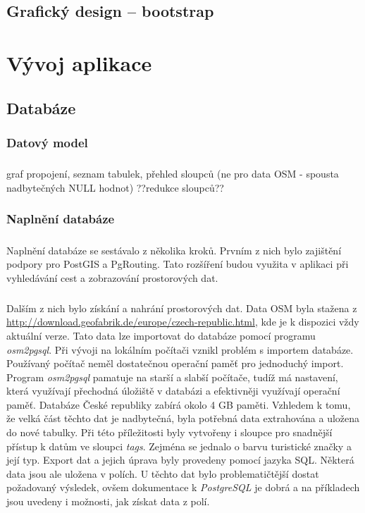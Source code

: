 \documentclass[11pt,a4paper,titlepage,oneside]{book}
\begin{document}
	\section{Grafický design -- bootstrap \cite{bootstrap}}

\chapter{Vývoj aplikace}
		\section{Databáze}
			\subsection{Datový model}
				\paragraph{} graf propojení, seznam tabulek, přehled sloupců (ne pro data OSM - spousta nadbytečných NULL hodnot) ??redukce sloupců??
			\subsection{Naplnění databáze}
				\paragraph{} Naplnění databáze se sestávalo z několika kroků. Prvním z nich bylo zajištění podpory pro PostGIS a PgRouting. Tato rozšíření budou využita v aplikaci při vyhledávání cest a zobrazování prostorových dat.
				\paragraph{}Dalším z nich bylo získání a nahrání prostorových dat. Data OSM byla stažena z  \url{http://download.geofabrik.de/europe/czech-republic.html}, kde je k dispozici vždy aktuální verze. Tato data lze importovat do databáze pomocí programu \textit{osm2pgsql}. Při vývoji na lokálním počítači vznikl problém s importem databáze. Používaný počítač neměl dostatečnou operační paměť pro jednoduchý import. Program \textit{osm2pgsql} pamatuje na starší a slabší počítače, tudíž má nastavení, která využívají přechodná úložiště v databázi a efektivněji využívají operační paměť. Databáze České republiky zabírá okolo 4 GB paměti. Vzhledem k tomu, že velká část těchto dat je nadbytečná, byla potřebná data extrahována a uložena do nové tabulky. Při této příležitosti byly vytvořeny i sloupce pro snadnější přístup k datům ve sloupci \textit{tags}. Zejména se jednalo o barvu turistické značky a její typ. Export dat a jejich úprava byly provedeny pomocí jazyka SQL. Některá data jsou ale uložena v polích. U těchto dat bylo problematičtější dostat požadovaný výsledek, ovšem dokumentace k \textit{PostgreSQL}\cite{PostgreSQL} je dobrá a na příkladech jsou uvedeny i možnosti, jak získat data z polí.
\end{document}
